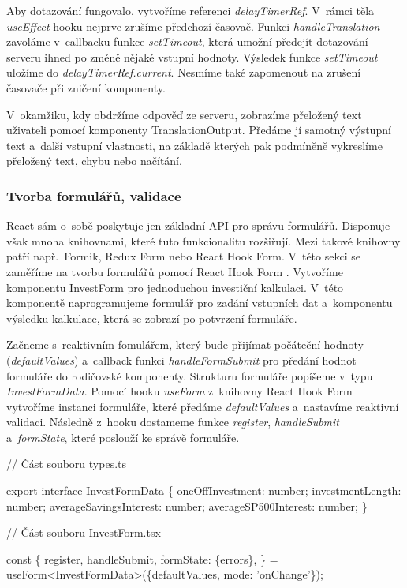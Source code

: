 Aby dotazování fungovalo, vytvoříme referenci \emph{delayTimerRef}. V~rámci těla \emph{useEffect} hooku nejprve zrušíme předchozí časovač. 
Funkci \emph{handleTranslation} zavoláme v~callbacku funkce \emph{setTimeout}, která umožní předejít dotazování serveru ihned po změně nějaké vstupní hodnoty. 
Výsledek funkce \emph{setTimeout} uložíme do \emph{delayTimerRef.current}. Nesmíme také zapomenout na zrušení časovače při zničení komponenty.

V~okamžiku, kdy obdržíme odpověď ze serveru, zobrazíme přeložený text uživateli pomocí komponenty TranslationOutput. 
Předáme jí samotný výstupní text a~další vstupní vlastnosti, na základě kterých pak podmíněně vykreslíme přeložený text, chybu nebo načítání.

\subsubsection*{Tvorba formulářů, validace}

React sám o~sobě poskytuje jen základní API pro správu formulářů. Disponuje však mnoha knihovnami, které tuto funkcionalitu rozšiřují. 
Mezi takové knihovny patří např.~Formik, Redux Form nebo React Hook Form. V~této sekci se zaměříme na tvorbu formulářů pomocí React Hook Form \cite{reacthookformlib}. 
Vytvoříme komponentu InvestForm pro jednoduchou investiční kalkulaci. 
V~této komponentě naprogramujeme formulář pro zadání vstupních dat a~komponentu výsledku kalkulace, která se zobrazí po potvrzení formuláře.

Začneme s~reaktivním fomulářem, který bude přijímat počáteční hodnoty (\emph{defaultValues}) a~callback funkci \emph{handleFormSubmit} pro předání hodnot formuláře do rodičovské komponenty. 
Strukturu formuláře popíšeme v~typu \emph{InvestFormData}. Pomocí hooku \emph{useForm} z~knihovny React Hook Form vytvoříme instanci formuláře, které předáme \emph{defaultValues} a~nastavíme reaktivní validaci. 
Následně z~hooku dostameme funkce \emph{register}, \emph{handleSubmit} a~\emph{formState}, které poslouží ke správě formuláře.

\begin{prog}
// Část souboru types.ts

export interface InvestFormData \{
  oneOffInvestment: number;
  investmentLength: number;
  averageSavingsInterest: number;
  averageSP500Interest: number;
\}

// Část souboru InvestForm.tsx

const \{
  register,
  handleSubmit,
  formState: \{errors\},
\} = useForm<InvestFormData>(\{defaultValues, mode: 'onChange'\});
\end{prog}

